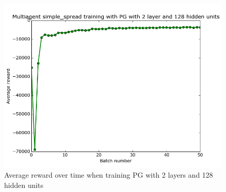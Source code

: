 \documentclass{article}
\begin{document}
\begin{figure}
\begin{center}
    \includegraphics[scale=0.25]{pg-2-128-gamma1}
    \caption{Average reward over time when training PG with 2 layers and 128 hidden units}
\end{center}
\label{fig:pg-2-128}
\end{figure}



\end{document}
